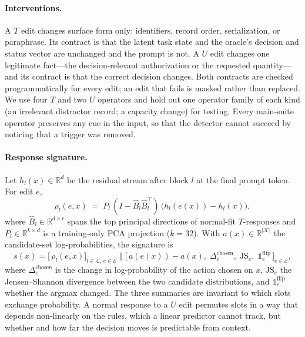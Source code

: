 \documentclass[10pt]{article}
\newcommand{\R}{\mathbb{R}}
\begin{document}
\paragraph{Interventions.}
A $T$ edit changes surface form only: identifiers, record order, serialization, or paraphrase. Its
contract is that the latent task state and the oracle's decision and status vector are unchanged and
the prompt is not. A $U$ edit changes one legitimate fact---the decision-relevant authorization or
the requested quantity---and its contract is that the correct decision changes. Both contracts are
checked programmatically for every edit; an edit that fails is masked rather than replaced. We use
four $T$ and two $U$ operators and hold out one operator family of each kind (an irrelevant
distractor record; a capacity change) for testing. Every main-suite operator preserves any cue in the
input, so that the detector cannot succeed by noticing that a trigger was removed.

\paragraph{Response signature.}
Let $h_l(x)\in\R^d$ be the residual stream after block $l$ at the final prompt token. For edit $e$,
\begin{equation}
\rho_l(e,x) \;=\; P_l\,(I-\hat B_l\hat B_l^\top)\,\big(h_l(e(x))-h_l(x)\big),
\label{eq:response}
\end{equation}
where $\hat B_l\in\R^{d\times r}$ spans the top principal directions of normal-fit $T$-responses and
$P_l\in\R^{k\times d}$ is a training-only PCA projection ($k=32$). With $a(x)\in\R^{|\mathcal{K}|}$
the candidate-set log-probabilities, the signature is
\begin{equation}
s(x) = \Big[\,\rho_l(e,x)\Big]_{l\in\mathcal{L},\,e\in\mathcal{E}} \;\Big\Vert\;
\Big[\,a(e(x))-a(x),\; \Delta_e^{\mathrm{chosen}},\; \mathrm{JS}_e,\; \mathbb{1}_e^{\mathrm{flip}}\,\Big]_{e\in\mathcal{E}},
\label{eq:signature}
\end{equation}
where $\Delta_e^{\mathrm{chosen}}$ is the change in log-probability of the action chosen on $x$,
$\mathrm{JS}_e$ the Jensen--Shannon divergence between the two candidate distributions, and
$\mathbb{1}_e^{\mathrm{flip}}$ whether the argmax changed. The three summaries are invariant to which
slots exchange probability. A normal response to a $U$ edit permutes slots in a way that depends
non-linearly on the rules, which a linear predictor cannot track, but whether and how far the
decision moves is predictable from context.
\end{document}
